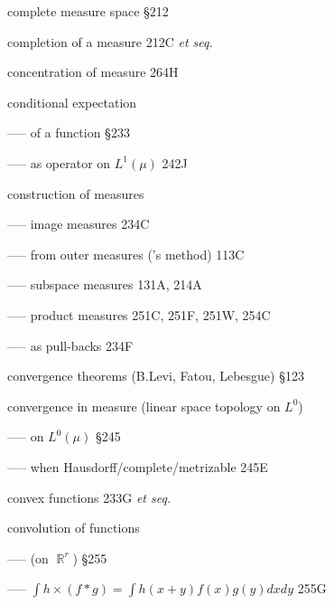 complete measure space \S212

completion of a measure 212C {\it et seq.}




concentration of measure 264H


conditional expectation

----- of a function \S233

----- as operator on $L^1(\mu)$ 242J

construction of measures

----- image measures 234C

----- from outer measures (\Caratheodory's method) 113C

----- subspace measures 131A, 214A

----- product measures 251C, 251F, 251W, 254C

















----- as pull-backs 234F


















convergence theorems (B.Levi, Fatou, Lebesgue) \S123

convergence in measure (linear space topology on $L^0$)

----- on $L^0(\mu)$ \S245



----- when Hausdorff/complete/metrizable 245E






convex functions 233G {\it et seq.}




convolution of functions

----- (on $\BbbR^r$) \S255




----- $\int h\times(f*g)=\int h(x+y)f(x)g(y)dxdy$ 255G


